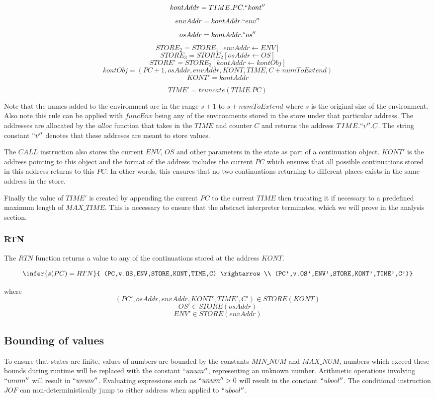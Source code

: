 \documentclass[12pt]{article}
\begin{document}
$$kontAddr = TIME.PC.``kont''$$
$$envAddr = kontAddr.``env''$$
$$osAddr = kontAddr.``os''$$
$$STORE_2=STORE_1[envAddr \leftarrow ENV]$$
$$STORE_3=STORE_2[osAddr \leftarrow OS]$$
$$STORE'=STORE_3[kontAddr \leftarrow kontObj]$$
$$kontObj = (PC+1,osAddr,envAddr,KONT,TIME,C+numToExtend)$$
$$KONT' = kontAddr$$

$$TIME' = truncate(TIME.PC)$$

Note that the names added to the environment are in the range $s+1$ to $s+numToExtend$ where $s$ is the original size of the environment. Also note this rule can be applied with $funcEnv$ being any of the environments stored in the store under that particular address. The addresses are allocated by the $alloc$ function that takes in the $TIME$ and counter $C$ and returns the address $TIME.``v''.C$. The string constant $``v''$ denotes that these addreses are meant to store values.

The $CALL$ instruction also stores the current $ENV$, $OS$ and other parameters in the state as part of a continuation object. $KONT'$ is the address pointing to this object and the format of the address includes the current $PC$ which ensures that all possible continuations stored in this address returns to this $PC$. In other words, this ensures that no two continuations returning to different places exists in the same address in the store.

Finally the value of $TIME'$ is created by appending the current $PC$ to the current $TIME$ then trucating it if necessary to a predefined maximum length of $MAX\_TIME$. This is necessary to ensure that the abstract interpreter terminates, which we will prove in the analysis section.

\subsubsection{RTN}
The $RTN$ function returns a value to any of the continuations stored at the address $KONT$.

$$\infer{s(PC) = RTN}{
    (PC,v.OS,ENV,STORE,KONT,TIME,C) \rightarrow \\
    (PC',v.OS',ENV',STORE,KONT',TIME',C')}$$

where
$$(PC',osAddr,envAddr,KONT',TIME',C') \in STORE(KONT)$$
$$OS' \in STORE(osAddr)$$
$$ENV' \in STORE(envAddr)$$

\subsection{Bounding of values}
To ensure that states are finite, values of numbers are bounded by the constants $MIN\_NUM$ and $MAX\_NUM$, numbers which exceed these bounds during runtime will be replaced with the constant $``unum''$, representing an unknown number. Arithmetic operations involving $``unum''$ will result in $``unum''$. Evaluating expressions such as $``unum'' > 0$ will result in the constant $``ubool''$. The conditional instruction $JOF$ can non-deterministically jump to either address when applied to $``ubool''$.
\end{document}
